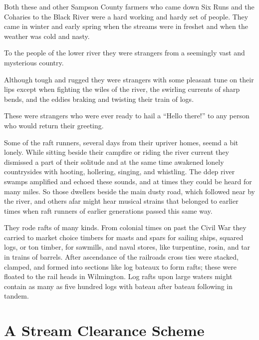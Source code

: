 \documentclass[11pt, a5paper, openright]{book}
\begin{document}
Both these and other Sampson County farmers who came down Six Runs and
the Coharies to the Black River were a hard working and hardy set of
people.  They came in winter and early spring when the streams were in
freshet and when the weather was cold and nasty.\par

To the people of the lower river they were strangers from a seemingly
vast and mysterious country.\par

Although tough and rugged they were strangers with some pleasant tune
on their lips except when fighting the wiles of the river, the
swirling currents of sharp bends, and the eddies braking and twisting
their train of logs.\par

These were strangers who were ever ready to hail a ``Hello there!'' to
any person who would return their greeting.\par

Some of the raft runners, several days from their upriver homes, seemd
a bit lonely.  While sitting beside their campfire or riding the river
current they dismissed a part of their solitude and at the same time
awakened lonely countrysides with hooting, hollering, singing, and
whistling.  The ddep river swamps amplified and echoed these sounds,
and at times they could be heard for many miles.  So those dwellers
beside the main dusty road, which followed near by the river, and
others afar might hear musical strains that belonged to earlier times
when raft runners of earlier generations passed this same way.\par

They rode rafts of many kinds.  From colonial times on past the Civil
War they carried to market choice timbers for masts and spars for
sailing ships, squared logs, or ton timber, for sawmills, and naval
stores, like turpentine, rosin, and tar in trains of barrels.  After
ascendance of the railroads cross ties were stacked, clamped, and
formed into sections like log bateaux to form rafts; these were
floated to the rail heads in Wilmington.  Log rafts upon large waters
might contain as many as five hundred logs with bateau after bateau
following in tandem.\par

\section[Stream Clearance Scheme]{A Stream Clearance Scheme}
\end{document}
